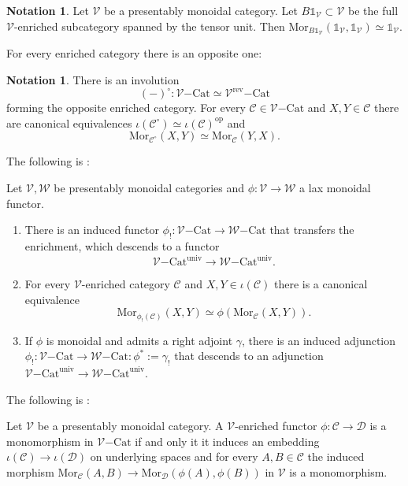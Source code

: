 \documentclass[10pt,oneside]{article}
\numberwithin{equation}{section} %
\numberwithin{figure}{section} %
\theoremstyle{plain}
\theoremstyle{definition}
\newtheorem{notation}[thm]{Notation}
\newcommand{\mC}{{\mathcal C}}
\newcommand{\mD}{{\mathcal D}}
\newcommand{\mV}{{\mathcal V}}
\newcommand{\mW}{{\mathcal W}}
\newcommand{\op}{\mathrm{op}}
\newcommand{\rev}{{\mathrm{rev}}}
\newcommand{\univ}{\mathrm{univ}}
\newcommand{\Cat}{\mathrm{Cat}}
\newcommand{\tu}{{\mathbb 1}}
\newcommand{\Mor}{{\mathrm{Mor}}}
\begin{document}
\begin{notation}Let $\mV$ be a presentably monoidal category.
Let $B\tu_\mV \subset \mV$ be the full $\mV$-enriched subcategory spanned by the tensor unit. Then $\Mor_{B\tu_\mV}(\tu_\mV, \tu_\mV) \simeq \tu_\mV.$
    
\end{notation}

For every enriched category there is an opposite one:

\begin{notation}
There is an involution $$(-)^\circ: {\mV\mathrm{-}\Cat} \simeq {\mV^\rev\mathrm{-}\Cat}$$ forming the opposite enriched category.
For every $\mC \in {\mV\mathrm{-}\Cat}$ and $X,Y \in \mC$
there are canonical equivalences
$ \iota(\mC^\circ) \simeq \iota(\mC)^\op$
and $$ \Mor_{\mC^\circ}(X,Y) \simeq \Mor_{\mC}(Y,X).$$
\end{notation}

The following is \cite[Proposition 3.72]{heine2024bienriched}:

\begin{proposition}

Let $\mV,\mW$ be presentably monoidal categories and 
$\phi:\mV \to \mW$ a lax monoidal functor.

\begin{enumerate}[\normalfont(1)]\setlength{\itemsep}{-2pt}
\item There is an induced functor
$\phi_!: \mV \mathrm{-}\Cat \to \mW \mathrm{-}\Cat$
that transfers the enrichment, which descends to a functor
$$\mV \mathrm{-}\Cat^\univ \to \mW \mathrm{-}\Cat^\univ.$$

\item For every $\mV$-enriched category $\mC$ and $X,Y \in \iota(\mC)$
there is a canonical equivalence
$$ \Mor_{\phi_!(\mC)}(X,Y) \simeq \phi(\Mor_\mC(X,Y)).$$

\item If $\phi$ is monoidal and admits a right adjoint $\gamma$,
there is an induced adjunction
$\phi_!: \mV \mathrm{-}\Cat \to \mW \mathrm{-}\Cat: \phi^*:=\gamma_!$
that descends to an adjunction 
$\mV \mathrm{-}\Cat^\univ \to \mW \mathrm{-}\Cat^\univ.$

\end{enumerate}

\end{proposition}

The following is \cite[Proposition 2.1.5]{GepnerHeine2026}:

\begin{proposition}\label{monochar}
Let $\mV$ be a presentably monoidal category.
A $\mV$-enriched functor $\phi: \mC \to \mD$ is a monomorphism in $\mV\mathrm{-}\Cat$ if and only it it induces an embedding $\iota(\mC) \to \iota(\mD)$ on underlying spaces and for every $A,B \in \mC$ the induced morphism 
$\Mor_\mC(A, B) \to \Mor_\mD(\phi(A), \phi(B))$ in $\mV$ is a monomorphism.
    
\end{proposition}
\end{document}
